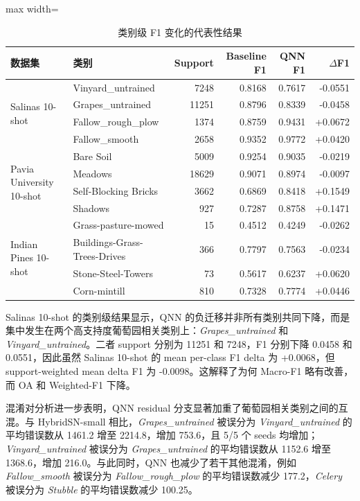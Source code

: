 \documentclass[UTF8,a4paper,zihao=-4,fontset=fandol]{ctexart}
\begin{document}
\begin{table}[htbp]
\centering
\caption{类别级 F1 变化的代表性结果}
\label{tab:class-level}
\begin{adjustbox}{max width=\textwidth}
\begin{tabular}{llrrrr}
\toprule
数据集 & 类别 & Support & Baseline F1 & QNN F1 & $\Delta$F1 \\
\midrule
\multirow{4}{*}{Salinas 10-shot}
& Vinyard\_untrained & 7248 & 0.8168 & 0.7617 & -0.0551 \\
& Grapes\_untrained & 11251 & 0.8796 & 0.8339 & -0.0458 \\
& Fallow\_rough\_plow & 1374 & 0.8759 & 0.9431 & +0.0672 \\
& Fallow\_smooth & 2658 & 0.9352 & 0.9772 & +0.0420 \\
\midrule
\multirow{4}{*}{Pavia University 10-shot}
& Bare Soil & 5009 & 0.9254 & 0.9035 & -0.0219 \\
& Meadows & 18629 & 0.9071 & 0.8974 & -0.0097 \\
& Self-Blocking Bricks & 3662 & 0.6869 & 0.8418 & +0.1549 \\
& Shadows & 927 & 0.7287 & 0.8758 & +0.1471 \\
\midrule
\multirow{4}{*}{Indian Pines 10-shot}
& Grass-pasture-mowed & 15 & 0.4512 & 0.4249 & -0.0262 \\
& Buildings-Grass-Trees-Drives & 366 & 0.7797 & 0.7563 & -0.0234 \\
& Stone-Steel-Towers & 73 & 0.5617 & 0.6237 & +0.0620 \\
& Corn-mintill & 810 & 0.7328 & 0.7774 & +0.0446 \\
\bottomrule
\end{tabular}
\end{adjustbox}
\end{table}

Salinas 10-shot 的类别级结果显示，QNN 的负迁移并非所有类别共同下降，而是集中发生在两个高支持度葡萄园相关类别上：\textit{Grapes\_untrained} 和 \textit{Vinyard\_untrained}。二者 support 分别为 11251 和 7248，F1 分别下降 0.0458 和 0.0551，因此虽然 Salinas 10-shot 的 mean per-class F1 delta 为 +0.0068，但 support-weighted mean delta F1 为 -0.0098。这解释了为何 Macro-F1 略有改善，而 OA 和 Weighted-F1 下降。

混淆对分析进一步表明，QNN residual 分支显著加重了葡萄园相关类别之间的互混。与 HybridSN-small 相比，\textit{Grapes\_untrained} 被误分为 \textit{Vinyard\_untrained} 的平均错误数从 1461.2 增至 2214.8，增加 753.6，且 5/5 个 seeds 均增加；\textit{Vinyard\_untrained} 被误分为 \textit{Grapes\_untrained} 的平均错误数从 1152.6 增至 1368.6，增加 216.0。与此同时，QNN 也减少了若干其他混淆，例如 \textit{Fallow\_smooth} 被误分为 \textit{Fallow\_rough\_plow} 的平均错误数减少 177.2，\textit{Celery} 被误分为 \textit{Stubble} 的平均错误数减少 100.25。
\end{document}

